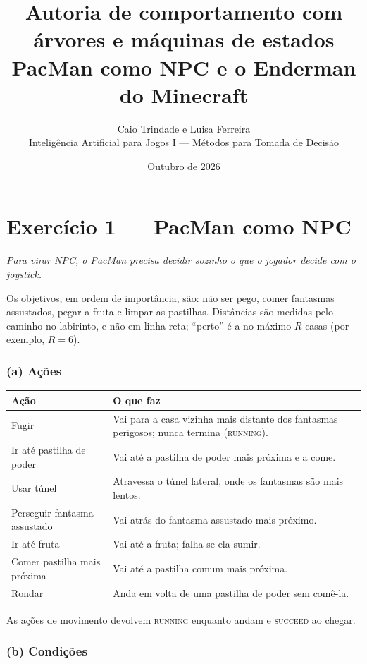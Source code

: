 \documentclass[11pt,a4paper]{article}
\title{\textbf{Autoria de comportamento com árvores e máquinas de estados}\\[0.3em]
  \large PacMan como NPC e o Enderman do Minecraft}
\author{Caio Trindade e Luisa Ferreira\\
  \small Inteligência Artificial para Jogos I --- Métodos para Tomada de Decisão}
\date{Outubro de 2026}
\newcommand{\gancho}[1]{\textcolor{destaque}{\textit{#1}}\par}
\newcommand{\st}[1]{\textsc{#1}}
\begin{document}
\maketitle

\part*{Exercício 1 --- PacMan como NPC}

\gancho{Para virar NPC, o PacMan precisa decidir sozinho o que o jogador
decide com o joystick.}

Os objetivos, em ordem de importância, são: não ser pego, comer fantasmas
assustados, pegar a fruta e limpar as pastilhas. Distâncias são medidas pelo
caminho no labirinto, e não em linha reta; ``perto'' é a no máximo $R$ casas
(por exemplo, $R = 6$).

\section{(a) Ações}

\begin{center}\small
\begin{tabularx}{\textwidth}{@{}>{\raggedright}p{4.2cm}X@{}}
\toprule
Ação & O que faz \\
\midrule
Fugir & Vai para a casa vizinha mais distante dos fantasmas perigosos;
  nunca termina (\st{running}). \\
Ir até pastilha de poder & Vai até a pastilha de poder mais próxima e a come. \\
Usar túnel & Atravessa o túnel lateral, onde os fantasmas são mais lentos. \\
Perseguir fantasma assustado & Vai atrás do fantasma assustado mais próximo. \\
Ir até fruta & Vai até a fruta; falha se ela sumir. \\
Comer pastilha mais próxima & Vai até a pastilha comum mais próxima. \\
Rondar & Anda em volta de uma pastilha de poder sem comê-la. \\
\bottomrule
\end{tabularx}
\end{center}

As ações de movimento devolvem \st{running} enquanto andam e \st{succeed} ao
chegar.

\section{(b) Condições}
\end{document}
